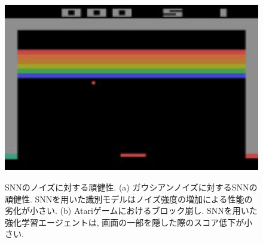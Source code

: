 \begin{figure}[htb]
    \centering

    \begin{minipage}{0.45\textwidth}
        \centering
        
        \label{fig:robust:gaussian}
    \end{minipage}
    \hspace{0.02\textwidth}
    \begin{minipage}{0.45\textwidth}
        \centering
        \includegraphics[width=1.0\textwidth]{Static/chap1_robust_atari.jpg}
        \label{fig:robust:atari}
    \end{minipage}

    \caption[SNNの頑健性]{
        SNNのノイズに対する頑健性.
        (a) ガウシアンノイズに対するSNNの頑健性. 
        SNNを用いた識別モデルはノイズ強度の増加による性能の劣化が小さい.
        (b) Atariゲームにおけるブロック崩し.
        SNNを用いた強化学習エージェントは, 画面の一部を隠した際のスコア低下が小さい.
    }
\end{figure}

